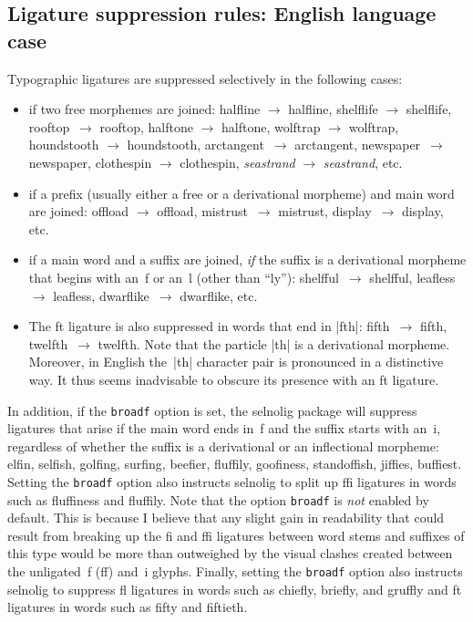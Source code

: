 \documentclass[11pt]{article}
\newcommand{\pkg}[1]{\textsf{#1}}
\newcommand{\opt}[1]{\texttt{#1}}
\begin{document}
\subsection{Ligature suppression rules: English language case}


Typographic ligatures are suppressed selectively in the following cases:
\begin{itemize}
\item if two free morphemes are joined: \mbox{halfline} $\to$ halfline, \mbox{shelflife} $\to$ shelflife, \mbox{rooftop}~$\to$ rooftop, \mbox{halftone} $\to$ halftone, \mbox{wolftrap} $\to$ wolftrap, \mbox{houndstooth} $\to$ houndstooth, \mbox{arctan}\-gent~$\to$ arctangent, \mbox{newspaper}~$\to$ newspaper, \mbox{clothespin} $\to$ clothespin, \emph{se\mbox{as}trand} $\to$ \emph{seastrand}, etc.

\item if a prefix (usually either a free or a derivational morpheme) and main word are joined: \mbox{offload} $\to$ offload, mi\mbox{st}rust~$\to$ mistrust, di\mbox{sp}lay~$\to$ display, etc. 

\item if a main word and a suffix are joined, \emph{if} the suffix is a derivational morpheme that begins with an~f or an~l (other than \enquote{ly}): \mbox{shelfful}~$\to$ shelfful, \mbox{leafless} $\to$ leafless, \mbox{dwarflike}~$\to$ dwarflike, etc. 

\item The ft ligature is also suppressed in words that end in |fth|: \mbox{fifth}~$\to$ fifth, \mbox{twelfth}~$\to$ twelfth. Note that the particle |th| is a derivational morpheme. Moreover, in English the~|th| character pair is pronounced in a distinctive way. It thus seems inadvisable to obscure its presence with an ft ligature.
\end{itemize}

In addition, if the \opt{broadf} option is set, the \pkg{selnolig} package will suppress ligatures that arise if the main word ends in~f and the suffix starts with an~i, regardless of whether the suffix is a derivational or an inflectional morpheme: elfin, selfish, golfing, surfing, beefier, fluffily, goofiness, standoffish, jiffies, buffiest. Setting the \opt{broadf} option also instructs \pkg{selnolig} to split up ffi ligatures in words such as fluffiness and fluffily. Note that the option \opt{broadf} is \emph{not} enabled by default. This is because I believe that any slight gain in readability that could result from breaking up the fi and ffi ligatures between word stems and suffixes of this type would be more than outweighed by the visual clashes created between the unligated~f (ff) and~i glyphs. Finally, setting the \opt{broadf} option also instructs \pkg{selnolig} to suppress fl ligatures in words such as chiefly, briefly, and gruffly and ft ligatures in words such as fifty and fiftieth.
\end{document}
